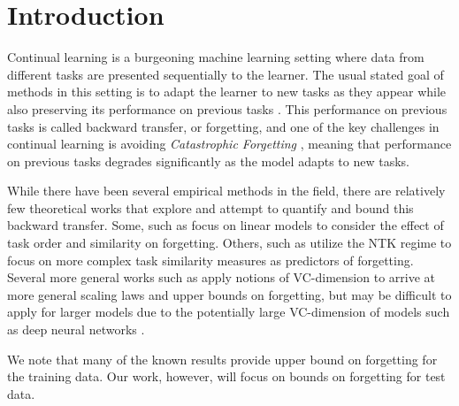 \documentclass{article}
\theoremstyle{plain}
\theoremstyle{definition}
\theoremstyle{remark}
\newcommand{\RM}[1]{{\textcolor{magenta}{#1}}}
\newcommand{\LF}[1]{{\textcolor{blue}{#1}}}
\begin{document}
\section{Introduction}

Continual learning is a burgeoning machine learning setting where data from different tasks
are presented sequentially to the learner. The usual stated goal of methods in this setting is to adapt the learner to new tasks as they appear while also preserving its performance on previous tasks \cite{de2021continual, hadsell2020embracing,parisi2019continual}.
This performance on previous tasks is called backward transfer, or forgetting, and one of the key challenges in continual learning is avoiding \emph{Catastrophic Forgetting} \cite{goodfellow2014empirical,ramasesh2020anatomy,kirkpatrick2017overcoming}, meaning that performance on previous tasks degrades significantly as the model adapts to new tasks. 

While there have been several empirical methods in the field, there are relatively few theoretical works that explore and attempt to quantify and bound this backward transfer. Some, such as \citet{evron2022catastrophic, lin2023theory} focus on linear models to consider the effect of task order and similarity on forgetting. Others, such as \citet{bennani2020generalisation, doan2021theoretical} utilize the NTK regime to focus on more complex task similarity measures as predictors of forgetting.
Several more general works such as \citet{benavides2022theory} apply notions of VC-dimension to arrive at more general scaling laws and upper bounds on forgetting, but may be difficult to apply for larger models due to the potentially large VC-dimension of models such as deep neural networks \citep{bartlett2019nearly}. %

We note that many of the known results \citep{bennani2020generalisation, evron2022catastrophic,  benavides2022theory} provide upper bound on forgetting for the training data. Our work, however, will focus on bounds on forgetting for test data.
\end{document}
